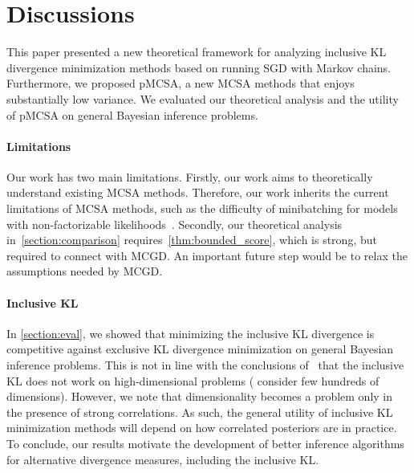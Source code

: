 
\vspace{-0.15in}
\section{Discussions}\label{section:discussion}
\vspace{-0.1in}
This paper presented a new theoretical framework for analyzing inclusive KL divergence minimization methods based on running SGD with Markov chains.
Furthermore, we proposed pMCSA, a new MCSA methods that enjoys substantially low variance.
We evaluated our theoretical analysis and the utility of pMCSA on general Bayesian inference problems.

\vspace{-0.1in}
\paragraph{Limitations}
Our work has two main limitations.
Firstly, our work aims to theoretically understand existing MCSA methods.
Therefore, our work inherits the current limitations of MCSA methods, such as the difficulty of minibatching for models with non-factorizable likelihoods~\citep{NEURIPS2020_b2070693}.
Secondly, our theoretical analysis in~\cref{section:comparison} requires~\cref{thm:bounded_score}, which is strong, but required to connect with MCGD.
An important future step would be to relax the assumptions needed by MCGD.

\vspace{-0.1in}
\paragraph{Inclusive KL}
In \cref{section:eval}, we showed that minimizing the inclusive KL divergence is competitive against exclusive KL divergence minimization on general Bayesian inference problems.
This is not in line with the conclusions of~\citet{dhaka_challenges_2021} that the inclusive KL does not work on high-dimensional problems (\citeauthor{dhaka_challenges_2021} consider few hundreds of dimensions).
However, we note that dimensionality becomes a problem only in the presence of strong correlations.
As such, the general utility of inclusive KL minimization methods will depend on how correlated posteriors are in practice.
To conclude, our results motivate the development of better inference algorithms for alternative divergence measures, including the inclusive KL. 


